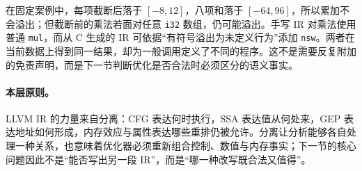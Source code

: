 在固定案例中，每项截断后落于 \([-8,12]\)，八项和落于 \([-64,96]\)，所以累加不会溢出；但截断前的乘法若面对任意 \texttt{i32} 数组，仍可能溢出。手写 IR 对乘法使用普通 \texttt{mul}，而从 C 生成的 IR 可依据“有符号溢出为未定义行为”添加 \texttt{nsw}。两者在当前数据上得到同一结果，却为一般调用定义了不同的程序。这不是需要反复附加的免责声明，而是下一节判断优化是否合法时必须区分的语义事实。

\paragraph{本层原则。}
LLVM IR 的力量来自分离：CFG 表达何时执行，SSA 表达值从何处来，GEP 表达地址如何形成，内存效应与属性表达哪些重排仍被允许。分离让分析能够各自处理一种关系，也意味着优化器必须重新组合控制、数值与内存事实；下一节的核心问题因此不是“能否写出另一段 IR”，而是“哪一种改写既合法又值得”。
